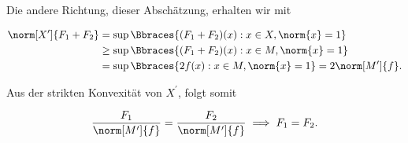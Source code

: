 \begin{solution}
\begin{enumerate}[label = Fall \arabic*:]
  Die andere Richtung, dieser Abschätzung, erhalten wir mit

  \begin{align*}
    \norm[X^\prime]{F_1 + F_2}
    & =
    \sup \Bbraces{(F_1 + F_2)(x): x \in X, \norm{x} = 1} \\
    & \geq
    \sup \Bbraces{(F_1 + F_2)(x): x \in M, \norm{x} = 1} \\
    & =
    \sup \Bbraces{2 f(x): x \in M, \norm{x} = 1}
    =
    2 \norm[M^\prime]{f}.
  \end{align*}

  Aus der strikten Konvexität von $X^\prime$, folgt somit

  \begin{align*}
    \frac{F_1}{\norm[M^\prime]{f}}
    =
    \frac{F_2}{\norm[M^\prime]{f}}
    \implies
    F_1 = F_2.
  \end{align*}

\end{enumerate}

\end{solution}
